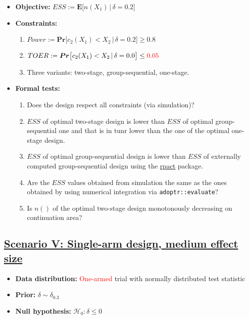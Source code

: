\documentclass[]{book}
\providecommand{\tightlist}{%
  \setlength{\itemsep}{0pt}\setlength{\parskip}{0pt}}
\begin{document}
\begin{itemize}
\tightlist
\item
  \textbf{Objective:} \(ESS := \boldsymbol{E}\big[n(X_1)\,|\,\delta=0.2\big]\)
\item
  \textbf{Constraints:}

  \begin{enumerate}
  \def\labelenumi{\arabic{enumi}.}
  \tightlist
  \item
    \(Power := \boldsymbol{Pr}\big[c_2(X_1) < X_2\,|\,\delta=0.2\big] \geq 0.8\)
  \item
    \(TOER := \boldsymbol{Pr}\big[c_2(X_1) < X_2\,|\,\delta=0.0\big] \leq \color{red}{0.05}\)
  \item
    Three variants: two-stage, group-sequential, one-stage.
  \end{enumerate}
\item
  \textbf{Formal tests:}

  \begin{enumerate}
  \def\labelenumi{\arabic{enumi}.}
  \tightlist
  \item
    Does the design respect all constraints (via simulation)?
  \item
    \(ESS\) of optimal two-stage design is lower than \(ESS\) of optimal
    group-sequential one and that is in tunr lower than the one of the
    optimal one-stage design.
  \item
    \(ESS\) of optimal group-sequential design is lower than \(ESS\) of
    externally computed group-sequential design using the \href{https://rpact.org/}{rpact} package.
  \item
    Are the \(ESS\) values obtained from simulation the same as the ones
    obtained by using numerical integration via \texttt{adoptr::evaluate}?
  \item
    Is \(n()\) of the optimal two-stage design monotonously decreasing on
    continuation area?
  \end{enumerate}
\end{itemize}

\hypertarget{scenario-v-single-arm-design-medium-effect-size}{%
\subsection{\texorpdfstring{\protect\hyperlink{scenarioV}{Scenario V: Single-arm design, medium effect size}}{Scenario V: Single-arm design, medium effect size}}\label{scenario-v-single-arm-design-medium-effect-size}}

\begin{itemize}
\tightlist
\item
  \textbf{Data distribution:} \textcolor{red}{One-armed} trial with normally distributed test statistic
\item
  \textbf{Prior:} \(\delta\sim\delta_{0.3}\)
\item
  \textbf{Null hypothesis:} \(\mathcal{H}_0:\delta \leq 0\)
\end{itemize}
\end{document}
